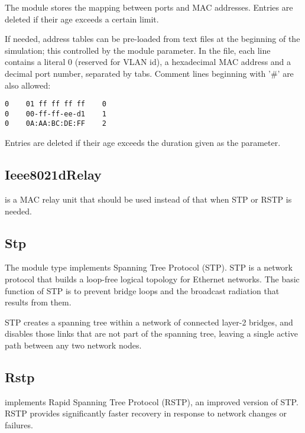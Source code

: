 The  module stores the mapping between ports and MAC addresses.
Entries are deleted if their age exceeds a certain limit.

If needed, address tables can be pre-loaded from text files at the beginning of
the simulation; this controlled by the  module parameter.
In the file, each line contains a literal 0 (reserved for VLAN id), a hexadecimal
MAC address and a decimal port number, separated by tabs. Comment lines
beginning with '\#' are also allowed:

\begin{verbatim}
0    01 ff ff ff ff    0
0    00-ff-ff-ee-d1    1
0    0A:AA:BC:DE:FF    2
\end{verbatim}

Entries are deleted if their age exceeds the duration given as the  parameter.


\subsection{Ieee8021dRelay}
\label{sec:ethernet:ieee8021drelay}

 is a MAC relay unit that should be used instead
of  that when STP or RSTP is needed.

\subsection{Stp}
\label{sec:ethernet:stp}

The  module type implements Spanning Tree Protocol (STP). STP
is a network protocol that builds a loop-free logical topology for Ethernet
networks. The basic function of STP is to prevent bridge loops and the broadcast
radiation that results from them.

STP creates a spanning tree within a network of connected layer-2 bridges, and
disables those links that are not part of the spanning tree, leaving a single
active path between any two network nodes.


\subsection{Rstp}
\label{sec:ethernet:rstp}

 implements Rapid Spanning Tree Protocol (RSTP), an improved
version of STP. RSTP provides significantly faster recovery in response to
network changes or failures.


